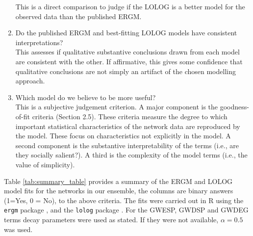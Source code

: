 \documentclass[
]{statsoc}
\begin{document}
\begin{enumerate}
This is a direct comparison to judge if the LOLOG is a better model for the observed data than the published ERGM.
\item Do the published ERGM and best-fitting LOLOG models have consistent interpretations?\\
This assesses if qualitative substantive conclusions drawn from each model are consistent with the other.
If affirmative, this gives some confidence that qualitative conclusions are not simply an artifact of the chosen modelling approach.
\item Which model do we believe to be more useful?\\
This is a subjective judgement criterion. A major component is the goodness-of-fit criteria (Section 2.5). These criteria measure the degree to which important statistical characteristics of the network data are reproduced by the model. These focus on characteristics not explicitly in the model. A second component is the substantive interpretability of the terms (i.e., are they socially salient?). A third is the complexity of the model terms (i.e., the value of simplicity).
\end{enumerate}

Table \ref{tab:summary_table} provides a summary of the ERGM and LOLOG
model fits for the networks in our ensemble, the columns are binary
answers (1=Yes, 0 = No), to the above criteria. The fits were carried
out in R using the \texttt{ergm} package \citep{ergm_3_9_4}, and the
\texttt{lolog} package \citep{LOLOG_github}. For the GWESP, GWDSP and
GWDEG terms decay parameters were used as stated. If they were not
available, \(\alpha= 0.5\) was used.
\end{document}
